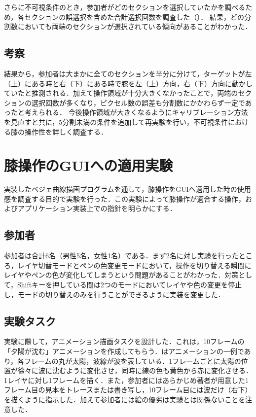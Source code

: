 \documentclass[submit, techrep]{ipsj}
\begin{document}
さらに不可視条件のとき，参加者がどのセクションを選択していたかを調べるため，各セクションの誤選択を含めた合計選択回数を調査した（）．
結果，どの分割数においても両端のセクションが選択されている傾向があることがわかった．
\par

\subsection{考察}
結果から，参加者は大まかに全てのセクションを半分に分けて，ターゲットが左（上）にある時と右（下）にある時で膝を左（上）方向，右（下）方向に動かしていたと推測される．加えて操作領域が十分大きくなかったことで，両端のセクションの選択回数が多くなり，ピクセル数の誤差も分割数にかかわらず一定であったと考えられる．
今後操作領域が大きくなるようにキャリブレーション方法を見直すと共に，5分割未満の条件を追加して再実験を行い，不可視条件における膝の操作性を詳しく調査する．
\section{膝操作のGUIへの適用実験}
実装したベジェ曲線描画プログラムを通して，膝操作をGUIへ適用した時の使用感を調査する目的で実験を行った．この実験によって膝操作が適合する操作，およびアプリケーション実装上での指針を明らかにする．
\subsection{参加者}
参加者は合計6名（男性5名，女性1名）である．まず2名に対し実験を行ったところ，レイヤ切替モードとペンの色変更モードにおいて，操作を切り替える瞬間にレイヤやペンの色が変化してしまうという問題があることがわかった．対策として，Shiftキーを押している間は2つのモードにおいてレイヤや色の変更を停止し，モードの切り替えのみを行うことができるように実装を変更した．

\subsection{実験タスク}
実験に際して，アニメーション描画タスクを設計した．これは，10フレームの「夕陽が沈む」アニメーションを作成してもらう．はアニメーションの一例であり，各フレームの丸が太陽，波線が波を表している．1フレームごとに太陽の位置が徐々に波に沈むように変化させ，同時に線の色も黄色から赤に変化させる．1レイヤに対し1フレームを描く．また，参加者にはあらかじめ著者が用意した1フレーム目の見本をトレースまたは書き写し，10フレーム目には波だけ（右下）を描くように指示した．加えて参加者には絵の優劣は実験とは関係ないことを注意した．
\end{document}
